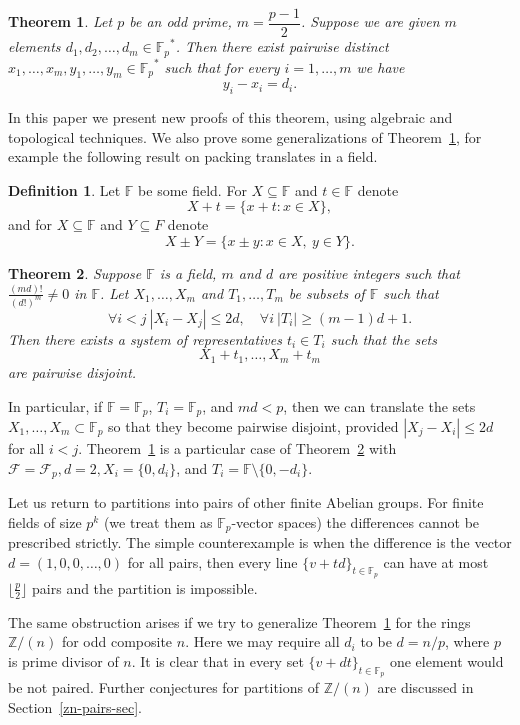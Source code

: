 \documentclass[12pt,a4paper]{amsart}
\newtheorem{thm}{Theorem}
\theoremstyle{definition}
\newtheorem{defn}{Definition}
\theoremstyle{remark}
\begin{document}
\begin{thm}
\label{p-part}
Let $p$ be an odd prime, $m=\dfrac{p-1}{2}$. Suppose we are given $m$ elements $d_1, d_2,\ldots, d_m\in {{\mathbb F_p}}^*$. Then there exist pairwise distinct $x_1,\ldots,x_m,y_1,\ldots,y_m\in {{\mathbb F_p}}^*$ such that for every $i=1,\ldots, m$ we have
$$
y_i-x_i  = d_i.
$$
\end{thm}

In this paper we present new proofs of this theorem, using algebraic and topological techniques. We also prove some generalizations of Theorem~\ref{p-part}, for example the following result on packing translates in a field.

\begin{defn}
Let $\mathbb F$ be some field. For $X\subseteq \mathbb F$ and $t\in \mathbb F$ denote
$$
X+t = \{x+t: x\in X\},
$$
and for $X\subseteq \mathbb F$ and $Y\subseteq F$ denote
$$
X\pm Y = \{x\pm y : x\in X,\ y\in Y\}.
$$
\end{defn}

\begin{thm}
\label{f-tr-pack}
Suppose $\mathbb F$ is a field, $m$ and $d$ are positive integers such that $\frac{(md)!}{(d!)^m}\ne 0$ in $\mathbb F$. Let $X_1, \ldots, X_m$ and $T_1,\ldots, T_m$ be subsets of $\mathbb F$ such that
$$
\forall i<j\ |X_i-X_j| \le 2d,\quad\forall i\ |T_i|\ge (m-1)d+1.
$$
Then there exists a system of representatives $t_i\in T_i$ such that the sets
$$
X_1+t_1,\ldots, X_m+t_m
$$
are pairwise disjoint.
\end{thm}

In particular, if $\mathbb F = {{\mathbb F_p}}$, $T_i={{\mathbb F_p}}$, and $md<p$, then we can translate the sets $X_1, \ldots, X_m\subset{{\mathbb F_p}}$ so that they become pairwise disjoint, provided $|X_j-X_i|\le 2d$ for all $i<j$. Theorem~\ref{p-part} is a particular case of Theorem~\ref{f-tr-pack} with $\mathcal F = \mathcal F_p, d=2, X_i=\{0, d_i\}$, and $T_i=\mathbb F\setminus \{0, -d_i\}$.

Let us return to partitions into pairs of other finite Abelian groups. For finite fields of size $p^k$ (we treat them as ${{\mathbb F_p}}$-vector spaces) the differences cannot be prescribed strictly. The simple counterexample is when the difference is the vector $d=(1,0,0,\ldots,0)$ for all pairs, then every line $\{v+td\}_{t\in {{\mathbb F_p}}}$ can have at most $\lfloor\frac{p}{2}\rfloor$ pairs and the partition is impossible.

The same obstruction arises if we try to generalize Theorem~\ref{p-part} for the rings $\mathbb Z/(n)$ for odd composite $n$. Here we may require all $d_i$ to be $d=n/p$, where $p$ is prime divisor of $n$. It is clear that in every set $\{v+dt\}_{t\in {{\mathbb F_p}}}$ one element would be not paired. Further conjectures for partitions of $\mathbb Z/(n)$ are discussed in Section~\ref{zn-pairs-sec}.
\end{document}
